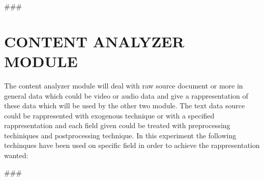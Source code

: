 
###

\section{CONTENT ANALYZER MODULE}\label{sec:ca}
The content analyzer module will deal with raw source document or more in general data which could be
video or audio data and give a rappresentation of these data which will be used by the other two module.
The text data source could be rappresented with exogenous technique or with a specified rappresentation
and each field given could be treated with preprocessing techiniques and postprocessing technique. In
this experiment the following techinques have been used on specific field in order to achieve the
rappresentation wanted:
\hfill\break
\hfill\break

###


\begin{comment}
Author = DIEGO MICCOLI
Alias = Kozen88
Organization = SWAP Research Group UniBa
Date = 27-12-2023

This mini template is not working by itself because there are latex command missing needed
to compile the file and give as output a pdf file, in addition it has been added jinja
statement in order to control the rendering of the latex file with the jinja library, for these
reasons it needs to be used with the other mini chunks in conjunction.
\end{comment}